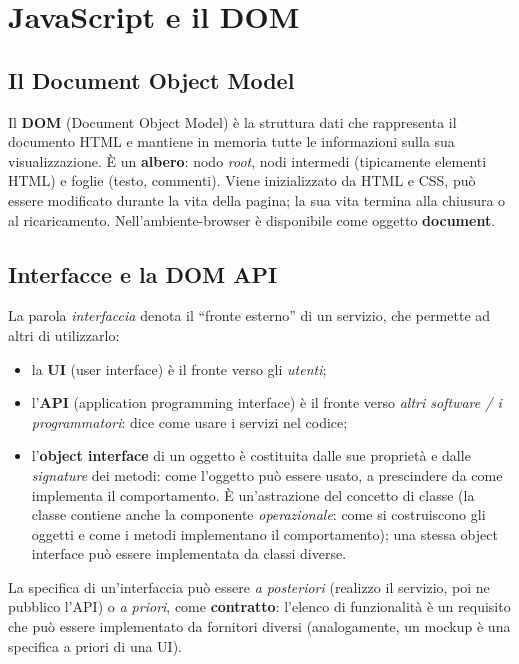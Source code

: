 \chapter{JavaScript e il DOM}

\section{Il Document Object Model}

\begin{definizione}[DOM]
Il \textbf{DOM} (Document Object Model) \`e la struttura dati che rappresenta il documento
HTML e mantiene in memoria tutte le informazioni sulla sua visualizzazione. \`E un
\textbf{albero}: nodo \emph{root}, nodi intermedi (tipicamente elementi HTML) e foglie
(testo, commenti). Viene inizializzato da HTML e CSS, pu\`o essere modificato durante la vita
della pagina; la sua vita termina alla chiusura o al ricaricamento. Nell'ambiente-browser
\`e disponibile come oggetto \textbf{document}.
\end{definizione}

\section{Interfacce e la DOM API}

La parola \emph{interfaccia} denota il ``fronte esterno'' di un servizio, che permette ad
altri di utilizzarlo:
\begin{itemize}
  \item la \textbf{UI} (user interface) \`e il fronte verso gli \emph{utenti};
  \item l'\textbf{API} (application programming interface) \`e il fronte verso \emph{altri
        software / i programmatori}: dice come usare i servizi nel codice;
  \item l'\textbf{object interface} di un oggetto \`e costituita dalle sue propriet\`a e dalle
        \emph{signature} dei metodi: come l'oggetto pu\`o essere usato, a prescindere da come
        implementa il comportamento. \`E un'astrazione del concetto di classe (la classe
        contiene anche la componente \emph{operazionale}: come si costruiscono gli oggetti e
        come i metodi implementano il comportamento); una stessa object interface pu\`o essere
        implementata da classi diverse.
\end{itemize}
La specifica di un'interfaccia pu\`o essere \emph{a posteriori} (realizzo il servizio, poi ne
pubblico l'API) o \emph{a priori}, come \textbf{contratto}: l'elenco di funzionalit\`a \`e un
requisito che pu\`o essere implementato da fornitori diversi (analogamente, un mockup \`e una
specifica a priori di una UI).

